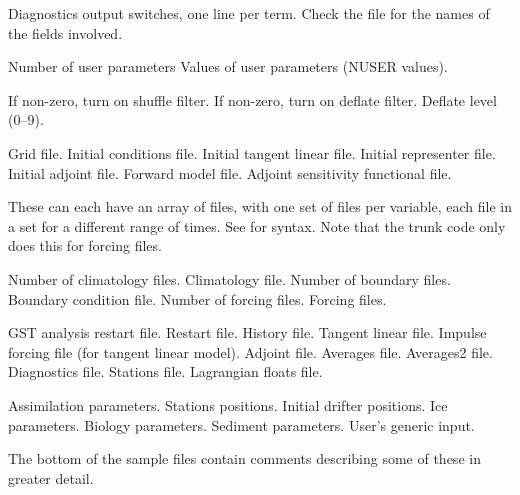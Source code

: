 \begin{klist}
\begin{klist}
        Diagnostics output switches, one line per term.
Check the  file for the names of the fields involved.
     \end{klist}
    \mbox{}
     \begin{klist}
           Number of user parameters
            Values of user parameters (NUSER values).
     \end{klist}
    \mbox{}
     \begin{klist}
           If non-zero, turn on shuffle filter.
           If non-zero, turn on deflate filter.
           Deflate level (0--9).
     \end{klist}
    \mbox{}
     \begin{klist}
         Grid file.
         Initial conditions file.
         Initial tangent linear file.
         Initial representer file.
         Initial adjoint file.
         Forward model file.
         Adjoint sensitivity functional file.
     \end{klist}
     These can
each have an array of files, with one set of files per variable,
each file in a set for a different range of times. See
 for syntax. Note that the trunk code only does this
for forcing files.
     \begin{klist}
         Number of climatology files.
         Climatology file.
         Number of boundary files.
         Boundary condition file.
         Number of forcing files.
         Forcing files.
     \end{klist}
     \mbox{}
     \begin{klist}
         GST analysis restart file.
         Restart file.
         History file.
         Tangent linear file.
         Impulse forcing file (for tangent linear model).
         Adjoint file.
         Averages file.
         Averages2 file.
         Diagnostics file.
         Stations file.
         Lagrangian floats file.
     \end{klist}
    \mbox{}
     \begin{klist}
         Assimilation parameters.
         Stations positions.
         Initial drifter positions.
         Ice parameters.
         Biology parameters.
         Sediment parameters.
         User's generic input.
     \end{klist}
\end{klist}
The bottom of the sample files contain comments describing some of these in
greater detail.

